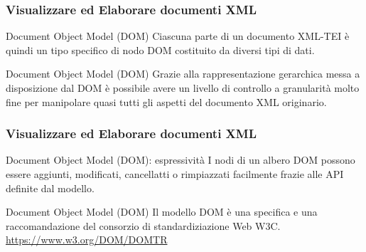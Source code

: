 \begin{frame}
    \frametitle{Visualizzare ed Elaborare documenti XML}
    \addtocounter{nframe}{1}
    

     \begin{block}{Document Object Model (DOM)}
        Ciascuna parte di un documento XML-TEI è quindi un tipo specifico di nodo DOM costituito da diversi tipi di dati.
     \end{block}

     \begin{block}{Document Object Model (DOM)}
        Grazie alla rappresentazione gerarchica messa a disposizione dal DOM è possibile avere un livello di controllo a granularità molto fine per manipolare quasi tutti gli aspetti del documento XML originario.
     \end{block}
     
\end{frame}

\begin{frame}
    \frametitle{Visualizzare ed Elaborare documenti XML}
    \addtocounter{nframe}{1}
    

     \begin{block}{Document Object Model (DOM): espressività}
       I nodi di un albero DOM possono essere aggiunti, modificati, cancellatti o rimpiazzati facilmente frazie alle API definite dal modello.
     \end{block}

     \begin{block}{Document Object Model (DOM)}
        Il modello DOM è una specifica e una raccomandazione del consorzio di standardiziazione Web W3C.
        \\\url{https://www.w3.org/DOM/DOMTR}
     \end{block}
     
\end{frame}

